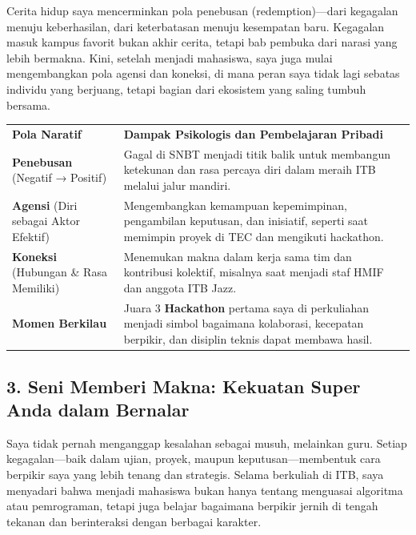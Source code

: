 \documentclass[
  letterpaper,
  DIV=11,
  numbers=noendperiod]{scrreprt}
\begin{document}
Cerita hidup saya mencerminkan pola penebusan (redemption)---dari
kegagalan menuju keberhasilan, dari keterbatasan menuju kesempatan baru.
Kegagalan masuk kampus favorit bukan akhir cerita, tetapi bab pembuka
dari narasi yang lebih bermakna. Kini, setelah menjadi mahasiswa, saya
juga mulai mengembangkan pola agensi dan koneksi, di mana peran saya
tidak lagi sebatas individu yang berjuang, tetapi bagian dari ekosistem
yang saling tumbuh bersama.

\begin{longtable}[]{@{}
  >{\raggedright\arraybackslash}p{}
  >{\raggedright\arraybackslash}p{}@{}}
\toprule\noalign{}
\endhead
\bottomrule\noalign{}
\endlastfoot
\textbf{Pola Naratif} & \textbf{Dampak Psikologis dan Pembelajaran
Pribadi} \\
\textbf{Penebusan} (Negatif → Positif) & Gagal di SNBT menjadi titik
balik untuk membangun ketekunan dan rasa percaya diri dalam meraih ITB
melalui jalur mandiri. \\
\textbf{Agensi} (Diri sebagai Aktor Efektif) & Mengembangkan kemampuan
kepemimpinan, pengambilan keputusan, dan inisiatif, seperti saat
memimpin proyek di TEC dan mengikuti hackathon. \\
\textbf{Koneksi} (Hubungan \& Rasa Memiliki) & Menemukan makna dalam
kerja sama tim dan kontribusi kolektif, misalnya saat menjadi staf HMIF
dan anggota ITB Jazz. \\
\textbf{Momen Berkilau} & Juara 3 \textbf{Hackathon} pertama saya di
perkuliahan menjadi simbol bagaimana kolaborasi, kecepatan berpikir, dan
disiplin teknis dapat membawa hasil. \\
\end{longtable}

\subsection{\texorpdfstring{\textbf{3. Seni Memberi Makna: Kekuatan
Super Anda dalam
Bernalar}}{3. Seni Memberi Makna: Kekuatan Super Anda dalam Bernalar}}\label{seni-memberi-makna-kekuatan-super-anda-dalam-bernalar}

Saya tidak pernah menganggap kesalahan sebagai musuh, melainkan guru.
Setiap kegagalan---baik dalam ujian, proyek, maupun
keputusan---membentuk cara berpikir saya yang lebih tenang dan
strategis. Selama berkuliah di ITB, saya menyadari bahwa menjadi
mahasiswa bukan hanya tentang menguasai algoritma atau pemrograman,
tetapi juga belajar bagaimana berpikir jernih di tengah tekanan dan
berinteraksi dengan berbagai karakter.
\end{document}
